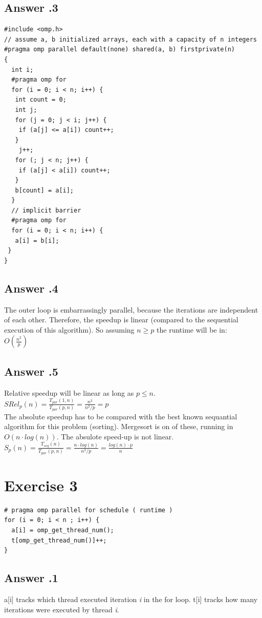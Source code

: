 \documentclass[a4paper,%
11pt,%
DIV=12,
headsepline,%
headings=normal,
]{scrartcl}
\newcounter{curex}
\newcommand{\exercise}[1]{\section*{Exercise #1}\setcounter{curex}{#1}}
\newcommand{\answer}[1]{\subsection*{Answer \arabic{curex}.#1}}
\begin{document}
\answer{3}
\begin{minipage}[t]{1.0\linewidth}
\begin{lstlisting}
#include <omp.h>
// assume a, b initialized arrays, each with a capacity of n integers
#pragma omp parallel default(none) shared(a, b) firstprivate(n)
{
  int i;
  #pragma omp for
  for (i = 0; i < n; i++) {
   int count = 0;
   int j;
   for (j = 0; j < i; j++) {
    if (a[j] <= a[i]) count++;
   }
    j++;
   for (; j < n; j++) {
    if (a[j] < a[i]) count++;
   }
   b[count] = a[i];
  }
  // implicit barrier
  #pragma omp for
  for (i = 0; i < n; i++) {
   a[i] = b[i];
 }
}
\end{lstlisting}
\end{minipage}

\answer{4}
The outer loop is embarrassingly parallel, because the iterations are independent of each other. Therefore, the speedup is linear (compared to the sequential execution of this algorithm). So assuming $n \geq p$ the runtime will be in:\\
\begin{math}O(\frac{n^2}{p})\end{math}\\

\answer{5}
Relative speedup will be linear as long as $p \leq n$.\\

\begin{math}SRel_{p}(n)=\frac{T_{par}(1,n)}{T_{par}(p,n)} = \frac{n^2}{n^2/p} = p \end{math}\\
The absolute speedup has to be compared with the best known sequantial algorithm for this problem (sorting). Mergesort is on of these, running in \begin{math}O(n \cdot log(n))\end{math}. The absulote speed-up is not linear.\\

\begin{math}S_{p}(n)=\frac{T_{seq}(n)}{T_{par}(p,n)} = \frac{n \cdot log(n)}{n^2/p} = \frac{log(n) \cdot p}{n} \end{math}\\



\exercise{3}
\begin{minipage}[t]{1.0\linewidth}
\begin{lstlisting}
# pragma omp parallel for schedule ( runtime )
for (i = 0; i < n ; i++) {
  a[i] = omp_get_thread_num();
  t[omp_get_thread_num()]++;
}
\end{lstlisting}
\end{minipage}
\answer{1}
a[i] tracks which thread executed iteration \emph{i} in the for loop.
t[i] tracks how many iterations were executed by thread \emph{i}.
\end{document}
